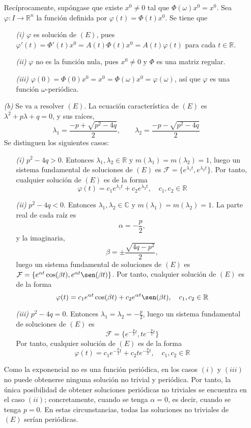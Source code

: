 \documentclass[11pt]{report}
\newcommand{\R}{\mathbb R}
\begin{document}
\begin{itemize}
    Recíprocamente, supóngase que existe $x^0 \neq 0$ tal que $\Phi(\omega)x^0=x^0$. Sea $\varphi \colon I \to \R^n$ la función definida por $\varphi(t) = \Phi(t) x^0$. Se tiene que
    \begin{itemize}
        \item[\textit{(i)}] $\varphi$ es solución de $(E)$, pues $\varphi'(t) = \Phi'(t)x^0 = A(t)\Phi(t)x^0=A(t)\varphi(t)$ para cada $t \in \R$.
        \item[\textit{(ii)}] $\varphi$ no es la función nula, pues $x^0 \neq 0$ y $\Phi$ es una matriz regular.
        \item[\textit{(iii)}] $\varphi(0) = \Phi(0)x^0=x^0=\Phi(\omega)x^0=\varphi(\omega)$, así que $\varphi$ es una función $\omega$-periódica.
    \end{itemize}
\item[\textit{(b)}] Se va a resolver $(E)$. La ecuación característica de $(E)$ es $\lambda^2+p\lambda+q=0$, y sus raíces,
\[\lambda_1=\frac{-p+\sqrt{p^2-4q}}{2}, \qquad \lambda_2=\frac{-p-\sqrt{p^2-4q}}{2}\]
Se distinguen los siguientes casos:
\begin{itemize}
    \item[\textit{(i)}] $p^2-4q>0$. Entonces $\lambda_1, \lambda_2 \in \R$ y $m(\lambda_1)=m(\lambda_2)=1$, luego un sistema fundamental de soluciones de $(E)$ es $\mathcal{F}=\{e^{\lambda_1t},e^{\lambda_2t}\}$. Por tanto, cualquier solución de $(E)$ es de la forma
    \[\varphi(t)=c_1e^{\lambda_1t}+c_2e^{\lambda_2t}, \quad c_1,c_2 \in \R\]
    \item[\textit{(ii)}] $p^2-4q<0$. Entonces $\lambda_1, \lambda_2 \in \mathbb{C}$ y $m(\lambda_1)=m(\lambda_2)=1$. La parte real de cada raíz es 
    \[\alpha=-\frac{p}{2},\] y la imaginaria, \[\beta=\pm \frac{\sqrt{4q-p^2}}{2},\] luego un sistema fundamental de soluciones de $(E)$ es $\mathcal{F}=\{e^{\alpha t}\cos(\beta t),e^{\alpha t}\sen(\beta t)\}$. Por tanto, cualquier solución de $(E)$ es de la forma
    \[\varphi(t)=c_1e^{\alpha t}\cos(\beta t)+c_2e^{\alpha t}\sen(\beta t), \quad c_1,c_2 \in \R\]
    \item[\textit{(iii)}] $p^2-4q=0$. Entonces $\lambda_1=\lambda_2=-\frac{p}{2}$, luego un sistema fundamental de soluciones de $(E)$ es
    \[\mathcal{F}=\{e^{-\frac{p}{2}t},te^{-\frac{p}{2}t}\}\]
    Por tanto, cualquier solución de $(E)$ es de la forma
    \[\varphi(t)=c_1e^{-\frac{p}{2}t}+c_2te^{-\frac{p}{2}t}, \quad c_1,c_2 \in \R\]
\end{itemize}
Como la exponencial no es una función periódica, en los casos $(i)$ y $(iii)$ no puede obtenerse ninguna solución no trivial y periódica. Por tanto, la única posibilidad de obtener soluciones periódicas no triviales se encuentra en el caso $(ii)$; concretamente, cuando se tenga $\alpha=0$, es decir, cuando se tenga $p=0$. En estas circunstancias, todas las soluciones no triviales de $(E)$ serían periódicas.


\end{itemize}
\end{document}
